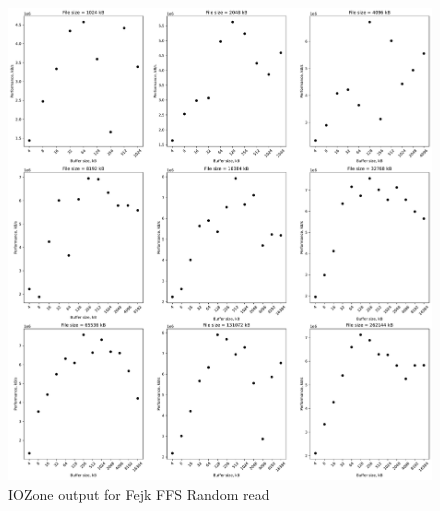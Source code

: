 \begin{figure}[!htb]
	\label{fig:bench_fffs_rnd_read}
	\begin{center}
		\includegraphics[width=1.0\textwidth]{figures/benchmarking/fejk-ffs/Random read.pdf}
	\end{center}
	\caption{IOZone output for Fejk FFS Random read}
\end{figure}

